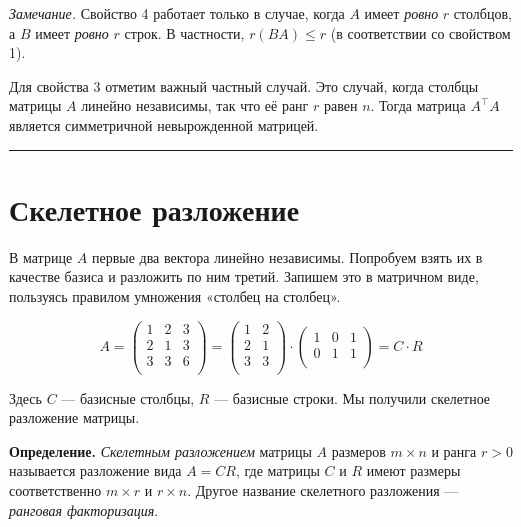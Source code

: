 \documentclass[11pt,a4paper]{article}
\begin{document}
    \emph{Замечание.} Свойство 4 работает только в случае, когда \(A\) имеет
\emph{ровно} \(r\) столбцов, а \(B\) имеет \emph{ровно} \(r\) строк. В
частности, \(r(BA) \le r\) (в соответствии со свойством 1).

Для свойства 3 отметим важный частный случай. Это случай, когда столбцы
матрицы \(A\) линейно независимы, так что её ранг \(r\) равен \(n\).
Тогда матрица \(A^\top A\) является симметричной невырожденной матрицей.

    \begin{center}\rule{0.5\linewidth}{0.5pt}\end{center}

    \hypertarget{ux441ux43aux435ux43bux435ux442ux43dux43eux435-ux440ux430ux437ux43bux43eux436ux435ux43dux438ux435}{%
\section{Скелетное
разложение}\label{ux441ux43aux435ux43bux435ux442ux43dux43eux435-ux440ux430ux437ux43bux43eux436ux435ux43dux438ux435}}

В матрице \(A\) первые два вектора линейно независимы. Попробуем взять
их в качестве базиса и разложить по ним третий. Запишем это в матричном
виде, пользуясь правилом умножения «столбец на столбец».

\[
  A = 
  \begin{pmatrix}
     1 & 2 & 3 \\
     2 & 1 & 3 \\
     3 & 3 & 6 \\
  \end{pmatrix}
  =
  \begin{pmatrix}
     1 & 2 \\
     2 & 1 \\
     3 & 3 \\
  \end{pmatrix}
  \cdot
  \begin{pmatrix}
     1 & 0 & 1 \\
     0 & 1 & 1 \\
  \end{pmatrix}
  = C \cdot R
\]

Здесь \(C\) --- базисные столбцы, \(R\) --- базисные строки. Мы получили
скелетное разложение матрицы.

\textbf{Определение.} \emph{Скелетным разложением} матрицы \(A\)
размеров \(m \times n\) и ранга \(r>0\) называется разложение вида
\(A = CR\), где матрицы \(C\) и \(R\) имеют размеры соответственно
\(m \times r\) и \(r \times n\). Другое название скелетного разложения
--- \emph{ранговая факторизация}.
\end{document}
